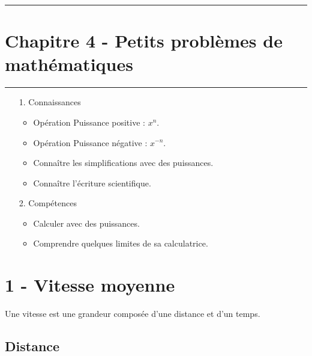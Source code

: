 \documentclass[12pt]{article}
\newcommand{\horrule}[1]{\rule{\linewidth}{#1}} %
\begin{document}

\newtheorem{Definition}{Définition}
\newtheorem{Theorem}{Théorème}
\newtheorem{Proposition}{Propriété}

\renewcommand{\labelitemi}{$\bullet$}
\renewcommand{\labelitemii}{$\circ$}

\setlength{\columnseprule}{1pt}

\horrule{2px}
\section*{Chapitre 4 - Petits problèmes de mathématiques}
\horrule{2px}

\begin{enumerate}
\item[1.] Connaissances
  \begin{itemize}
  \item Opération Puissance positive : $x^n$.
  \item Opération Puissance négative : $x^{-n}$.
  \item Connaître les simplifications avec des puissances.
  \item Connaître l'écriture scientifique.
  \end{itemize}
\item[2.] Compétences
  \begin{itemize}
  \item Calculer avec des puissances.
  \item Comprendre quelques limites de sa calculatrice.
  \end{itemize}
\end{enumerate}

\section*{1 - Vitesse moyenne}

Une vitesse est une grandeur composée d'une distance et d'un temps.

\subsection*{Distance}
\end{document}
